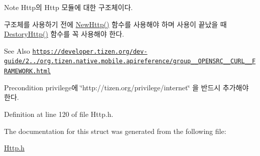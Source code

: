 \begin{DoxyNote}{Note}
Http의 Http 모듈에 대한 구조체이다. \par
 구조체를 사용하기 전에 \hyperlink{Http_8h_a8f651c47670c3bb629ce2fe7e5d64d57}{New\-Http()} 함수를 사용해야 하며 사용이 끝났을 때 \hyperlink{Http_8h_afc5917bb56ffeda1df7514c8238f0cc4}{Destory\-Http()} 함수를 꼭 사용해야 한다. 
\end{DoxyNote}
\begin{DoxySeeAlso}{See Also}
\href{https://developer.tizen.org/dev-guide/2.3.0/org.tizen.native.mobile.apireference/group__OPENSRC__CURL__FRAMEWORK.html}{\tt https\-://developer.\-tizen.\-org/dev-\/guide/2../org.\-tizen.\-native.\-mobile.\-apireference/group\-\_\-\-\_\-\-O\-P\-E\-N\-S\-R\-C\-\_\-\-\_\-\-C\-U\-R\-L\-\_\-\-\_\-\-F\-R\-A\-M\-E\-W\-O\-R\-K.\-html} 
\end{DoxySeeAlso}
\begin{DoxyPrecond}{Precondition}
privilege에 \char`\"{}http\-://tizen.\-org/privilege/internet\char`\"{} 을 반드시 추가해야 한다. 
\end{DoxyPrecond}


Definition at line 120 of file Http.\-h.



The documentation for this struct was generated from the following file\-:\begin{DoxyCompactItemize}
\item 
\hyperlink{Http_8h}{Http.\-h}\end{DoxyCompactItemize}

